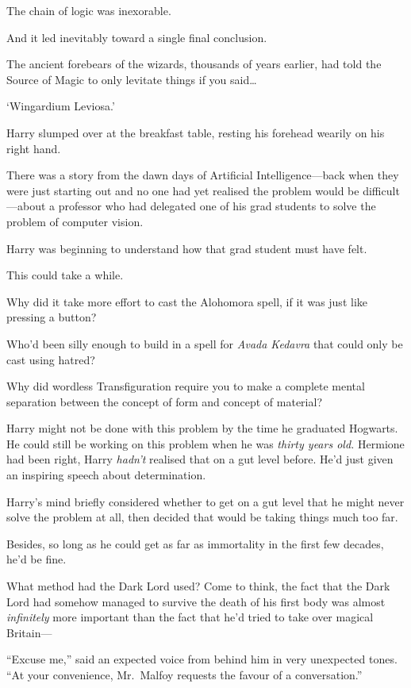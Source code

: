 The chain of logic was inexorable.

And it led inevitably toward a single final conclusion.

The ancient forebears of the wizards, thousands of years earlier, had
told the Source of Magic to only levitate things if you said\ldots{}

`Wingardium Leviosa.'

Harry slumped over at the breakfast table, resting his forehead wearily
on his right hand.

There was a story from the dawn days of Artificial Intelligence---back
when they were just starting out and no one had yet realised the problem
would be difficult---about a professor who had delegated one of his grad
students to solve the problem of computer vision.

Harry was beginning to understand how that grad student must have felt.

This could take a while.

Why did it take more effort to cast the Alohomora spell, if it was just
like pressing a button?

Who'd been silly enough to build in a spell for \emph{Avada Kedavra}
that could only be cast using hatred?

Why did wordless Transfiguration require you to make a complete mental
separation between the concept of form and concept of material?

Harry might not be done with this problem by the time he graduated
Hogwarts. He could still be working on this problem when he was
\emph{thirty years old.} Hermione had been right, Harry \emph{hadn't}
realised that on a gut level before. He'd just given an inspiring speech
about determination.

Harry's mind briefly considered whether to get on a gut level that he
might never solve the problem at all, then decided that would be taking
things much too far.

Besides, so long as he could get as far as immortality in the first few
decades, he'd be fine.

What method had the Dark Lord used? Come to think, the fact that the
Dark Lord had somehow managed to survive the death of his first body was
almost \emph{infinitely} more important than the fact that he'd tried to
take over magical Britain---

``Excuse me,'' said an expected voice from behind him in very unexpected
tones. ``At your convenience, Mr.~Malfoy requests the favour of a
conversation.''

